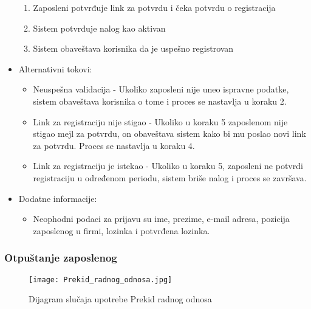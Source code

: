 \documentclass[a4paper]{article}
\begin{document}
\begin{itemize}
\begin{enumerate}
            \item Zaposleni potvrđuje link za potvrdu i čeka potvrdu o registracija
            \item Sistem potvrđuje nalog kao aktivan
            \item Sistem obaveštava korisnika da je uspešno registrovan 
        \end{enumerate}
    \item Alternativni tokovi:
        \begin{itemize}
            \item Neuspešna validacija - Ukoliko zaposleni nije uneo ispravne podatke, sistem obaveštava korisnika o tome i proces se nastavlja u koraku 2.
            \item Link za registraciju nije stigao - Ukoliko u koraku 5 zaposlenom nije stigao mejl za potvrdu, on obaveštava sistem kako bi mu poslao novi link za potvrdu. Proces se nastavlja u koraku 4.
            \item Link za registraciju je istekao - Ukoliko u koraku 5, zaposleni ne potvrdi registraciju u određenom periodu, sistem briše nalog i proces se završava.
        \end{itemize}
    \item Dodatne informacije:
        \begin{itemize}
            \item Neophodni podaci za prijavu su ime, prezime, e-mail adresa, pozicija zaposlenog u firmi, lozinka i potvrđena lozinka.
        \end{itemize}
\end{itemize}

\subsubsection{Otpuštanje zaposlenog}

\begin{figure}[htp]
    \centering
    \texttt{[image: Prekid\_radnog\_odnosa.jpg]}
    \caption{Dijagram slučaja upotrebe Prekid radnog odnosa}
    \label{fig:Prekid}
\end{figure}
\end{document}
